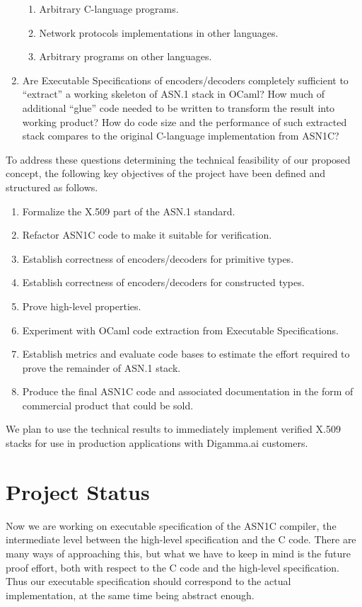 \documentclass[acmsmall,nonacm]{acmart}
\begin{document}
\begin{enumerate}
\begin{enumerate}
    \item Arbitrary C-language programs.
    \item Network protocols implementations in other languages.
    \item Arbitrary programs on other languages.
    \end{enumerate}
  \item Are Executable Specifications of encoders/decoders completely sufficient to ``extract'' a working skeleton of ASN.1 stack in OCaml? How much of additional ``glue'' code needed to be written to transform the result into working product? How do code size and the performance of such extracted stack compares to the original C-language implementation from ASN1C?  
\end{enumerate}

To address these questions determining the technical feasibility of
our proposed concept, the following key objectives of the project have
been defined and structured as follows.

\begin{enumerate}
\item Formalize the X.509 part of the ASN.1 standard.     
\item Refactor ASN1C code to make it suitable for verification.
\item Establish correctness of encoders/decoders for primitive types.
\item Establish correctness of encoders/decoders for constructed types.
\item Prove high-level properties.
\item Experiment with OCaml code extraction from Executable Specifications.
\item Establish metrics and evaluate code bases to estimate the effort required to prove the remainder of ASN.1 stack.
\item Produce the final ASN1C code and associated documentation in the form of commercial product that could be sold.
\end{enumerate}

We plan to use the technical results to immediately implement verified
X.509 stacks for use in production applications with Digamma.ai
customers.
 
\section{Project Status}

Now we are working on executable specification of the ASN1C
compiler, the intermediate level between the high-level specification
and the C code. There are many ways of approaching this, but what we
have to keep in mind is the future proof effort, both with respect to
the C code and the high-level specification. Thus our executable
specification should correspond to the actual implementation, at the
same time being abstract enough.
\end{document}
